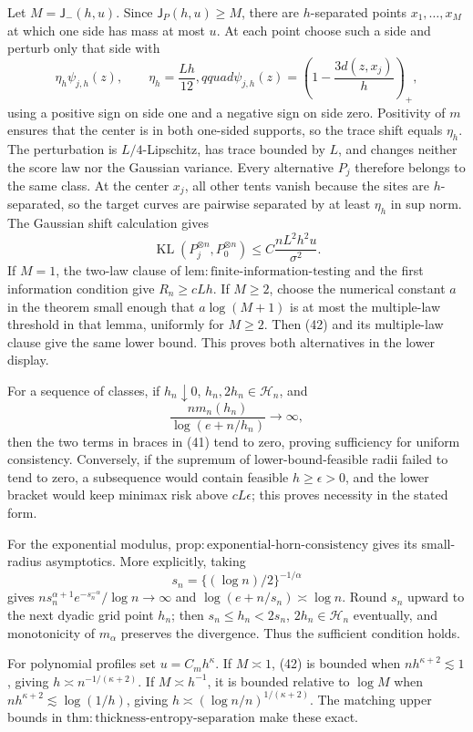 Let \(M=\mathsf J_{-}(h,u)\).  Since \(\mathsf J_P(h,u)\ge M\), there are \(h\)-separated points \(x_1,\ldots,x_M\) at which one side has mass at most \(u\).  At each point choose such a side and perturb only that side with
\[
 \eta_h\psi_{j,h}(z),\qquad
 \eta_h=\frac{Lh}{12},qquad
 \psi_{j,h}(z)=\left(1-\frac{3d(z,x_j)}h\right)_+,
\]
using a positive sign on side one and a negative sign on side zero.  Positivity of \(m\) ensures that the center is in both one-sided supports, so the trace shift equals \(\eta_h\).  The perturbation is \(L/4\)-Lipschitz, has trace bounded by \(L\), and changes neither the score law nor the Gaussian variance.  Every alternative \(P_j\) therefore belongs to the same class.  At the center \(x_j\), all other tents vanish because the sites are \(h\)-separated, so the target curves are pairwise separated by at least \(\eta_h\) in sup norm.  The Gaussian shift calculation gives
\[
 \operatorname{KL}(P_j^{\otimes n},P_0^{\otimes n})
 \le C\frac{nL^2h^2u}{\sigma^2}. \tag{42}
\]
If \(M=1\), the two-law clause of \(\mathrm{lem:finite\text{-}information\text{-}testing}\) and the first information condition give \(R_n\ge cLh\).  If \(M\ge2\), choose the numerical constant \(a\) in the theorem small enough that \(a\log(M+1)\) is at most the multiple-law threshold in that lemma, uniformly for \(M\ge2\).  Then (42) and its multiple-law clause give the same lower bound.  This proves both alternatives in the lower display.

For a sequence of classes, if \(h_n\downarrow0\), \(h_n,2h_n\in\mathcal H_n\), and
\[
 \frac{nm_n(h_n)}{\log(e+n/h_n)}\longrightarrow\infty,
\]
then the two terms in braces in (41) tend to zero, proving sufficiency for uniform consistency.  Conversely, if the supremum of lower-bound-feasible radii failed to tend to zero, a subsequence would contain feasible \(h\ge\epsilon>0\), and the lower bracket would keep minimax risk above \(cL\epsilon\); this proves necessity in the stated form.

For the exponential modulus, \(\mathrm{prop:exponential\text{-}horn\text{-}consistency}\) gives its small-radius asymptotics.  More explicitly, taking
\[
 s_n=\{(\log n)/2\}^{-1/\alpha}
\]
gives \(ns_n^{\alpha+1}e^{-s_n^{-\alpha}}/\log n\to\infty\) and \(\log(e+n/s_n)\asymp\log n\).  Round \(s_n\) upward to the next dyadic grid point \(h_n\); then \(s_n\le h_n<2s_n\), \(2h_n\in\mathcal H_n\) eventually, and monotonicity of \(m_{\alpha}\) preserves the divergence.  Thus the sufficient condition holds.

For polynomial profiles set \(u=C_mh^{\kappa}\).  If \(M\asymp1\), (42) is bounded when \(nh^{\kappa+2}\lesssim1\), giving \(h\asymp n^{-1/(\kappa+2)}\).  If \(M\asymp h^{-1}\), it is bounded relative to \(\log M\) when \(nh^{\kappa+2}\lesssim\log(1/h)\), giving \(h\asymp(\log n/n)^{1/(\kappa+2)}\).  The matching upper bounds in \(\mathrm{thm:thickness\text{-}entropy\text{-}separation}\) make these exact.


